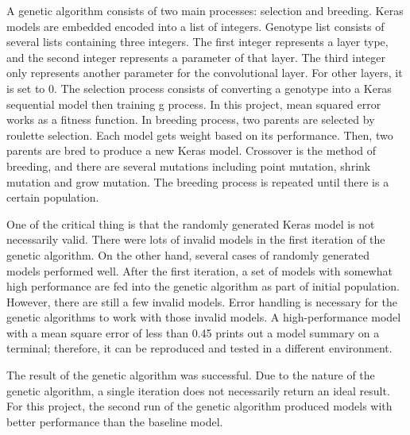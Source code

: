 \documentclass[11pt, natbib=false]{article}
\begin{document}
A genetic algorithm consists of two main processes: selection and breeding.
Keras models are embedded encoded into a list of integers.
Genotype list consists of several lists containing three integers.
The first integer represents a layer type, and the second integer represents a parameter of that layer.
The third integer only represents another parameter for the convolutional layer.
For other layers, it is set to 0.
The selection process consists of converting a genotype into a Keras sequential model then training g process.
In this project, mean squared error works as a fitness function.
In breeding process, two parents are selected by roulette selection.
Each model gets weight based on its performance.
Then, two parents are bred to produce a new Keras model.
Crossover is the method of breeding, and there are several mutations including point mutation, shrink mutation and grow mutation.
The breeding process is repeated until there is a certain population.

One of the critical thing is that the randomly generated Keras model is not necessarily valid.
There were lots of invalid models in the first iteration of the genetic algorithm.
On the other hand, several cases of randomly generated models performed well.
After the first iteration, a set of models with somewhat high performance are fed into the genetic algorithm as part of initial population.
However, there are still a few invalid models.
Error handling is necessary for the genetic algorithms to work with those invalid models.
A high-performance model with a mean square error of less than 0.45 prints out a model summary on a terminal; therefore, it can be reproduced and tested in a different environment.

The result of the genetic algorithm was successful.
Due to the nature of the genetic algorithm, a single iteration does not necessarily return an ideal result.
For this project, the second run of the genetic algorithm produced models with better performance than the baseline model.
\end{document}
